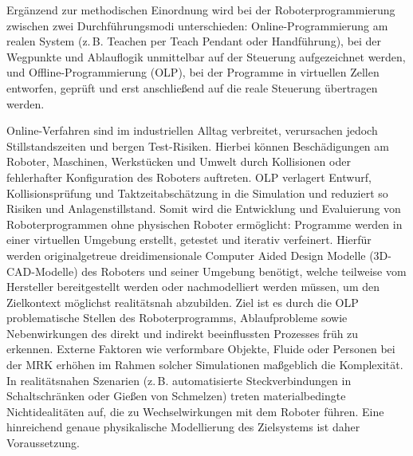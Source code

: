 Ergänzend zur methodischen Einordnung
wird bei der Roboterprogrammierung zwischen zwei
Durchführungsmodi unterschieden:
Online-Programmierung am realen System (z.\,B. Teachen per Teach
Pendant oder Handführung), bei der Wegpunkte und Ablauflogik
unmittelbar auf der Steuerung aufgezeichnet werden, und
Offline-Programmierung (OLP), bei der Programme in
virtuellen Zellen entworfen, geprüft und erst anschließend auf die
reale Steuerung übertragen
werden.

Online-Verfahren sind im industriellen Alltag verbreitet, verursachen
jedoch Stillstandszeiten und bergen
Test-Risiken. Hierbei können Beschädigungen am
Roboter, Maschinen, Werkstücken und Umwelt durch Kollisionen oder fehlerhafter
Konfiguration des Roboters auftreten. OLP verlagert
Entwurf, Kollisionsprüfung und Taktzeitabschätzung in die Simulation
und reduziert so Risiken und Anlagenstillstand.
Somit wird die Entwicklung und Evaluierung
von Roboterprogrammen ohne physischen Roboter
ermöglicht: Programme werden in einer virtuellen Umgebung
erstellt, getestet und
iterativ verfeinert. Hierfür werden originalgetreue dreidimensionale
Computer Aided Design Modelle (3D-CAD-Modelle) des Roboters
und seiner Umgebung benötigt, welche teilweise vom Hersteller
bereitgestellt werden oder nachmodelliert werden müssen, um den
Zielkontext möglichst realitätsnah abzubilden. Ziel ist es durch die OLP
problematische Stellen des Roboterprogramms, Ablaufprobleme sowie
Nebenwirkungen des direkt und indirekt beeinflussten
Prozesses früh zu erkennen.
 Externe
Faktoren wie verformbare Objekte, Fluide oder Personen bei der MRK erhöhen im
Rahmen solcher Simulationen maßgeblich die
Komplexität. In realitätsnahen Szenarien (z.\,B. automatisierte
Steckverbindungen in Schaltschränken oder Gießen von Schmelzen) treten
materialbedingte Nichtidealitäten auf, die zu Wechselwirkungen mit dem Roboter
führen. Eine hinreichend genaue physikalische Modellierung des Zielsystems ist
daher Voraussetzung.

